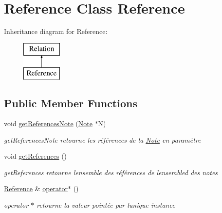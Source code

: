 \hypertarget{classReference}{}\section{Reference Class Reference}
\label{classReference}
Inheritance diagram for Reference\+:\begin{figure}[H]
\begin{center}
\leavevmode
\includegraphics[height=2.000000cm]{classReference}
\end{center}
\end{figure}
\subsection*{Public Member Functions}
\begin{DoxyCompactItemize}
\item 
void \hyperlink{classReference_ab804f3401b2e29c1b4e6c92896d66d0a}{get\+References\+Note} (\hyperlink{classNote}{Note} $\ast$N)
\begin{DoxyCompactList}\small\item\em get\+References\+Note retourne les références de la \hyperlink{classNote}{Note} en paramètre \end{DoxyCompactList}\item 
\mbox{\label{classReference_af09455e15425c5a82491a22569496abc}} 
void \hyperlink{classReference_af09455e15425c5a82491a22569496abc}{get\+References} ()
\begin{DoxyCompactList}\small\item\em get\+References retourne l\textquotesingle{}ensemble des références de l\textquotesingle{}ensembled des notes \end{DoxyCompactList}\item 
\mbox{\label{classReference_adf2012d05f8ec519da77c22aaecda7c0}} 
\hyperlink{classReference}{Reference} \& \hyperlink{classReference_adf2012d05f8ec519da77c22aaecda7c0}{operator$\ast$} ()
\begin{DoxyCompactList}\small\item\em operator $\ast$ retourne la valeur pointée par l\textquotesingle{}unique instance \end{DoxyCompactList}\end{DoxyCompactItemize}
